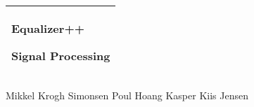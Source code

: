 %
\begin{titlepage}
  \addtolength{\hoffset}{0.5\evensidemargin-0.5\oddsidemargin} %
  \noindent%
  \centering
  \begin{tabular}{@{}p{}@{}}
    \toprule[2pt]
    \midrule
    \vspace{0.2cm}
    \begin{center}
    \Huge{\textbf{
      Equalizer++ %
    }}
    \end{center}
    \begin{center}
      \Large{
      Signal Processing
      }
    \end{center}
    \vspace{0.2cm}\\
    \midrule
    \toprule[2pt]
  \end{tabular}  
  
  \centering
  \vspace{0.7 cm}
  {
  Mikkel Krogh Simonsen \hspace{0.5 cm} Poul Hoang \hspace{0.5 cm} Kasper Kiis Jensen\\
  }

  \vspace{0.4 cm}
\begin{figure}[H]
\centering
\end{figure}
\end{titlepage}

\clearpage